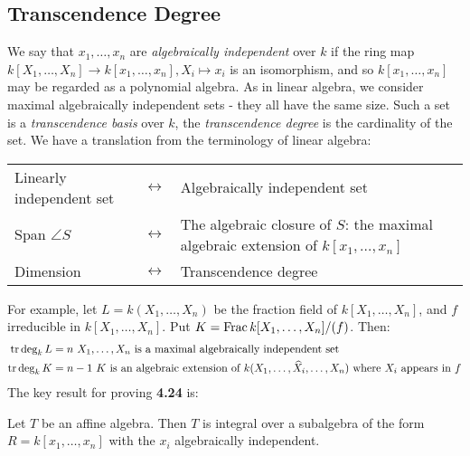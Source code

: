 \documentclass[10pt,a4paper]{article}
\begin{document}
\subsection{Transcendence Degree}
We say that $x_1, \ldots, x_n$ are \emph{algebraically independent} over $k$ if the ring map $k[X_1, \ldots, X_n]\to k[x_1, \ldots, x_n], X_i \mapsto x_i$ is an isomorphism, and so $k[x_1, \ldots, x_n]$ may be regarded as a polynomial algebra. As in linear algebra, we consider maximal algebraically independent sets - they all have the same size. Such a set is a \emph{transcendence basis} over $k$, the \emph{transcendence degree} is the cardinality of the set. We have a translation from the terminology of linear algebra:
\begin{center}
\begin{tabular}{
  p{}
  p{}
  p{}
}
  \raggedleft Linearly independent set & $\longleftrightarrow$ & Algebraically independent set\\
  \raggedleft Span $\angle{S}$ & $\longleftrightarrow$ &  The algebraic closure of $S$: the maximal algebraic extension of $k[x_1, \ldots, x_n]$\\
  \raggedleft Dimension & $\longleftrightarrow$ & Transcendence degree \\
\end{tabular}
\end{center}
For example, let $L = k(X_1, \ldots, X_n)$ be the fraction field of $k[X_1, \ldots, X_n]$, and $f$ irreducible in $k[X_1, \ldots, X_n]$. Put $K = \operatorname{Frac} k[X_1, \ldots, X_n]/(f)$. Then:
\begin{align*}
  \operatorname{tr} \deg_k L &= n \text{ $X_1,\ldots,X_n$ is a maximal algebraically independent set}\\
  \operatorname{tr} \deg_k K &= n-1 \text{ $K$ is an algebraic extension of $k(X_1, \ldots, \widehat{X}_i, \ldots, X_n)$ where $X_i$ appears in $f$}
\end{align*}
The key result for proving \textbf{4.24} is:
\begin{theorem}
  Let $T$ be an affine algebra. Then $T$ is integral over a subalgebra of the form $R = k[x_1, \ldots, x_n]$ with the $x_i$ algebraically independent.
\end{theorem}
\end{document}
